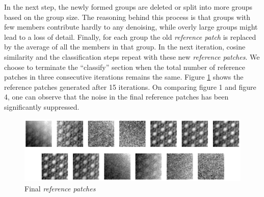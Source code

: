 \documentclass[fleqn,10pt]{wlscirep}
\begin{document}
In the next step, the newly formed groups are deleted or split into more groups based on the group size. The reasoning behind this process is that groups with few members contribute hardly to any denoising, while overly large groups might lead to a loss of detail.  Finally, for each group the old \textit{reference patch} is replaced by the average of all the members in that group. In the next iteration, cosine similarity and the classification steps repeat with these new \textit{reference patches}. We choose to terminate the “classify” section when the total number of reference patches in three consecutive iterations remains the same. Figure \ref{fig:final_reference_patches} shows the reference patches generated after 15 iterations. On comparing figure 1 and figure 4, one can observe that the noise in the final reference patches has been significantly suppressed.


\begin{figure}
	\centering
	\includegraphics[scale=0.8]{./imgs/final_reference_patches.png}
	\caption{Final \textit{reference patches}}
	\label{fig:final_reference_patches}
\end{figure} 
\end{document}

